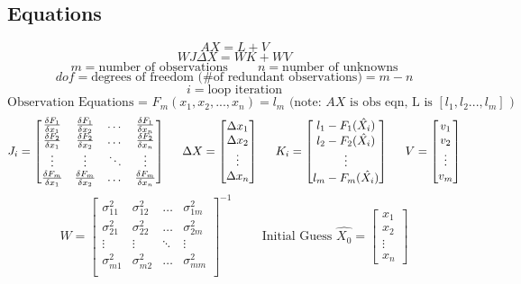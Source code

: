 \subsection{Equations}
\[
AX = L + V
\]
\[
WJ\Delta X=WK+WV 
\]
\[
m = \text{number of observations} \hspace{1cm} 
n = \text{number of unknowns}
\]
\[
dof = \text{degrees of freedom (\# of redundant observations)} = m-n
\]
\[
i = \text{loop iteration}
\]
\[
\text{Observation Equations =  } F_m(x_1,x_2,...,x_n) = l_m \text{ (note: }AX\text{ is obs eqn, L is }[l_1,l_2...,l_m] \text{ )}
\]
\[
J_i = \begin{bmatrix}
\frac{\delta F_1}{\delta x_1} & \frac{\delta F_1}{\delta x_2} & \dots & \frac{\delta F_1}{\delta x_n} \\
\frac{\delta F_2}{\delta x_1} & \frac{\delta F_2}{\delta x_2} & \dots & \frac{\delta F_2}{\delta x_n} \\
\vdots & \vdots & \ddots& \vdots \\
\frac{\delta F_m}{\delta x_1} & \frac{\delta F_m}{\delta x_2} & \dots & \frac{\delta F_m}{\delta x_n} \\
\end{bmatrix}
\hspace{0.5cm}
\Delta X = 
\begin{bmatrix}
\Delta x_1 \\ \Delta x_2 \\ \vdots \\ \Delta x_n
\end{bmatrix}
\hspace{0.5cm}
K_i = 
\begin{bmatrix}
l_1 - F_1(\hat{X_i}) \\ l_2 - F_2(\hat{X_i})\\ \vdots \\ l_m - F_m(\hat{X_i})
\end{bmatrix}
\hspace{0.5cm}
V = 
\begin{bmatrix}
v_1 \\ v_2 \\ \vdots \\ v_m
\end{bmatrix}
\]
\[
W = 
\begin{bmatrix}
\sigma_{11}^2 & \sigma_{12}^2 & \dots & \sigma_{1m}^2 \\ 
\sigma_{21}^2 & \sigma_{22}^2 & \dots & \sigma_{2m}^2 \\ 
\vdots & \vdots & \ddots& \vdots \\
\sigma_{m1}^2 & \sigma_{m2}^2 & \dots & \sigma_{mm}^2 \\ 
\end{bmatrix}
^{-1}
\hspace{1cm}
\text{Initial Guess } \hat{X_0} = 
\begin{bmatrix}
x_1 \\ x_2 \\ \vdots \\ x_n
\end{bmatrix}
\]
